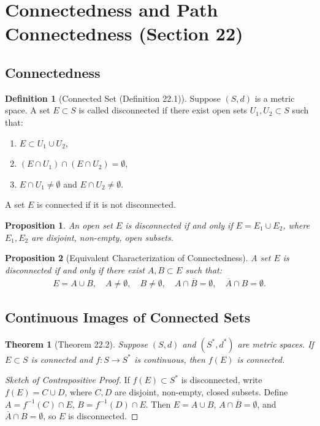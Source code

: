 \documentclass[9pt]{article}
\theoremstyle{definition}
\newtheorem{definition}{Definition}
\theoremstyle{plain}
\newtheorem{theorem}{Theorem}
\newtheorem{proposition}{Proposition}
\begin{document}
\section*{Connectedness and Path Connectedness (Section 22)}

\subsection*{Connectedness}
\begin{definition}[Connected Set (Definition 22.1)]
Suppose $ (S, d) $ is a metric space. A set $ E \subset S $ is called disconnected if there exist open sets $ U_1, U_2 \subset S $ such that:
\begin{enumerate}
    \item $ E \subset U_1 \cup U_2 $,
    \item $ (E \cap U_1) \cap (E \cap U_2) = \emptyset $,
    \item $ E \cap U_1 \neq \emptyset $ and $ E \cap U_2 \neq \emptyset $.
\end{enumerate}
A set $ E $ is connected if it is not disconnected.
\end{definition}

\begin{proposition}
An open set $ E $ is disconnected if and only if $ E = E_1 \cup E_2 $, where $ E_1, E_2 $ are disjoint, non-empty, open subsets.
\end{proposition}

\begin{proposition}[Equivalent Characterization of Connectedness]
A set $ E $ is disconnected if and only if there exist $ A, B \subset E $ such that:
\begin{align}
E = A \cup B, \quad A \neq \emptyset, \quad B \neq \emptyset, \quad A \cap \overline{B} = \emptyset, \quad \overline{A} \cap B = \emptyset.
\end{align}
\end{proposition}

\subsection*{Continuous Images of Connected Sets}
\begin{theorem}[Theorem 22.2]
Suppose $ (S, d) $ and $ (S^*, d^*) $ are metric spaces. If $ E \subset S $ is connected and $ f : S \to S^* $ is continuous, then $ f(E) $ is connected.
\end{theorem}

\begin{proof}[Sketch of Contrapositive Proof]
If $ f(E) \subset S^* $ is disconnected, write $ f(E) = C \cup D $, where $ C, D $ are disjoint, non-empty, closed subsets. Define $ A = f^{-1}(C) \cap E $, $ B = f^{-1}(D) \cap E $. Then $ E = A \cup B $, $ A \cap \overline{B} = \emptyset $, and $ \overline{A} \cap B = \emptyset $, so $ E $ is disconnected.
\end{proof}
\end{document}
